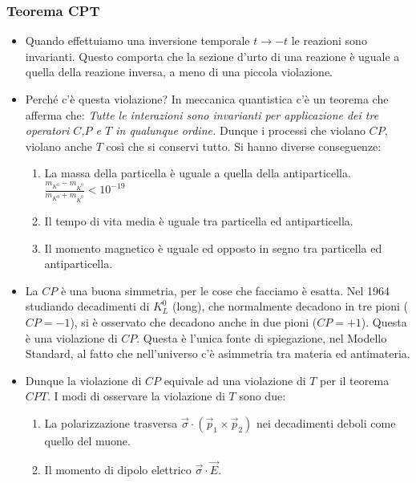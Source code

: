 \subsubsection{Teorema CPT}
\begin{itemize}
    \item Quando effettuiamo una inversione temporale $t\to-t$ le reazioni sono invarianti. Questo comporta che la sezione d'urto di una reazione è uguale a quella della reazione inversa, a meno di una piccola violazione. 
    \item Perché c'è questa violazione? In meccanica quantistica c'è un teorema che afferma che:\textit{ Tutte le interazioni sono invarianti per applicazione dei tre operatori $C$,$P$ e $T$ in qualunque ordine.} Dunque i processi che violano $CP$, violano anche $T$ così che si conservi tutto. Si hanno diverse conseguenze:
    \begin{enumerate}
    \item La massa della particella è uguale a quella della antiparticella. $\frac{m_{K^0}-m_{\bar K^0}}{m_{K^0}+m_{\bar K^0}}<10^{-19}$
    \item Il tempo di vita media è uguale tra particella ed antiparticella.
    \item Il momento magnetico è uguale ed opposto in segno tra particella ed antiparticella.
    \end{enumerate}
    \item La $CP$ è una buona simmetria, per le cose che facciamo è esatta. Nel 1964 studiando decadimenti di $K^0_L$ (long), che normalmente decadono in tre pioni ($CP=-1$), si è osservato che decadono anche in due pioni ($CP=+1$). Questa è una violazione di $CP$. Questa è l'unica fonte di spiegazione, nel Modello Standard, al fatto che nell'universo c'è asimmetria tra materia ed antimateria. 
    \item Dunque la violazione di $CP$ equivale ad una violazione di $T$ per il teorema $CPT$. I modi di osservare la violazione di $T$ sono due:
    \begin{enumerate}
        \item La polarizzazione trasversa $\vec\sigma\cdot(\vec p_1\times \vec p_2)$ nei decadimenti deboli come quello del muone.
        \item Il momento di dipolo elettrico $\vec\sigma\cdot\vec E$.
    \end{enumerate}
\end{itemize}
